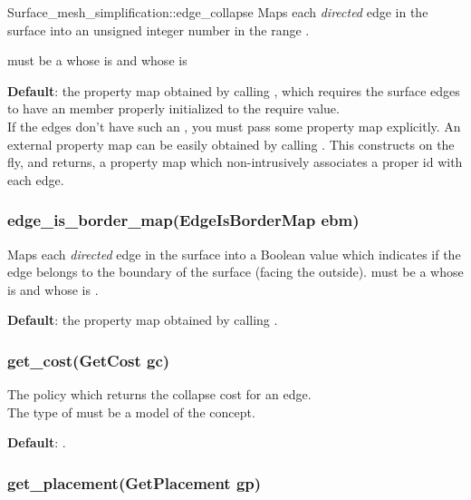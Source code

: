 \begin{ccRefFunction}{Surface_mesh_simplification::edge_collapse}
Maps each {\em directed} edge in the surface into an unsigned integer number
in the range \ccc{[0,num_edges(surface))}.

 must be a
whose  is
and whose  is 

\textbf{Default}: the property map obtained by calling ,
which requires the surface edges to have an  member properly initialized to the 
require value.\\
If the edges don't have such an , you must pass some property map explicitly.
An external property map can be easily obtained by calling 
. This constructs on the fly, and returns,
a property map which non-intrusively associates a proper id with each edge.

\subsubsection*{edge\_is\_border\_map(EdgeIsBorderMap ebm)} 

Maps each {\em directed} edge in the surface into a Boolean value
which indicates if the edge belongs to the boundary of the surface
(facing the outside).
 must be a 
whose  is
and whose  is .

\textbf{Default}: the property map obtained by calling .

\subsubsection*{get\_cost(GetCost gc)}

The policy which returns the collapse cost for an edge.\\
The type of  must be a model of the  concept.

\textbf{Default}: 
.

\subsubsection*{get\_placement(GetPlacement gp)}


\end{ccRefFunction}
